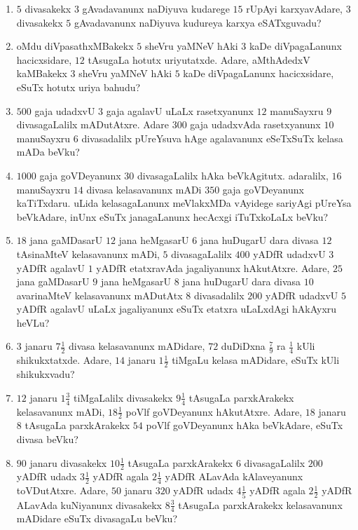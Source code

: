 \begin{enumerate}[\rm (1)]
\item $5$ divasakekx $3$ gAvadavanunx naDiyuva kudarege $15$ rUpAyi karxyavAdare, $3$ divasakekx $5$ gAvadavanunx naDiyuva kudureya karxya eSATxguvadu?

\item oMdu diVpasathxMBakekx $5$ sheVru yaMNeV hAki $3$ kaDe diVpagaLanunx hacicxsidare, $12$ tAsugaLa hotutx uriyutatxde. Adare, aMthAdedxV kaMBakekx $3$ sheVru yaMNeV hAki $5$ kaDe diVpagaLanunx hacicxsidare, eSuTx hotutx uriya bahudu? 

\item $500$ gaja udadxvU $3$ gaja agalavU uLaLx rasetxyanunx $12$ manuSayxru $9$ divasagaLalilx mADutAtxre. Adare $300$ gaja udadxvAda rasetxyanunx $10$ manuSayxru $6$ divasadalilx pUreYsuva hAge agalavanunx eSeTxSuTx kelasa mADa beVku?

\item $1000$  gaja goVDeyanunx $30$ divasagaLalilx hAka beVkAgitutx. adaralilx, $16$ manuSayxru $14$ divasa kelasavanunx mADi $350$ gaja goVDeyanunx kaTiTxdaru. uLida kelasagaLanunx meVlakxMDa vAyidege sariyAgi pUreYsa beVkAdare, inUnx eSuTx janagaLanunx hecAcxgi iTuTxkoLaLx beVku?

\item $18$ jana gaMDasarU $12$ jana heMgasarU $6$ jana huDugarU dara divasa $12$ tAsinaMteV kelasavanunx mADi, $5$ divasagaLalilx $400$ yADfR udadxvU $3$ yADfR agalavU $1$ yADfR etatxravAda jagaliyanunx hAkutAtxre. Adare, $25$ jana gaMDasarU $9$ jana heMgasarU $8$ jana huDugarU dara divasa $10$ avarinaMteV kelasavanunx mADutAtx $8$ divasadalilx $200$ yADfR udadxvU $5$ yADfR agalavU uLaLx jagaliyanunx eSuTx etatxra uLaLxdAgi hAkAyxru heVLu?

\item $3$ janaru $7\tfrac{1}{2}$ divasa kelasavanunx mADidare, $72$ duDiDxna $\tfrac{7}{9}$ ra $\tfrac{1}{4}$ kUli shikukxtatxde. Adare, $14$ janaru $1\tfrac{1}{2}$ tiMgaLu kelasa mADidare, eSuTx kUli shikukxvadu?

\item $12$ janaru $1\tfrac{3}{4}$ tiMgaLalilx divasakekx $9\tfrac{1}{4}$  tAsugaLa parxkArakekx kelasavanunx mADi, $18\tfrac{1}{2}$ poVlf goVDeyanunx hAkutAtxre. Adare, $18$ janaru $8$ tAsugaLa parxkArakekx $54$ poVlf goVDeyanunx hAka beVkAdare, eSuTx divasa beVku?

\item $90$ janaru divasakekx $10\tfrac{1}{2}$ tAsugaLa parxkArakekx $6$ divasagaLalilx $200$ yADfR udadx $3\tfrac{1}{2}$ yADfR agala $2\tfrac{1}{4}$ yADfR ALavAda kAlaveyanunx toVDutAtxre. Adare, $50$ janaru $320$ yADfR udadx $4\tfrac{1}{5}$ yADfR agala $2\tfrac{1}{2}$ yADfR ALavAda kuNiyanunx divasakekx $8\tfrac{3}{4}$ tAsugaLa parxkArakekx kelasavanunx mADidare eSuTx divasagaLu beVku?


\end{enumerate}
